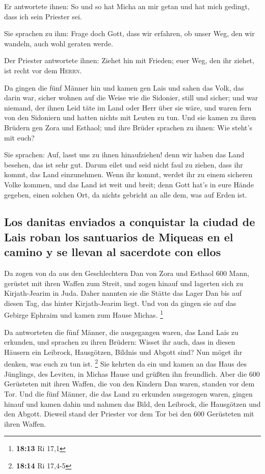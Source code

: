  Er antwortete ihnen: So und so hat Micha an mir getan und
hat mich gedingt, dass ich sein Priester sei.

 Sie sprachen zu ihm: Frage doch Gott, dass wir erfahren,
ob unser Weg, den wir wandeln, auch wohl geraten werde.

 Der Priester antwortete ihnen: Ziehet hin mit Frieden;
euer Weg, den ihr ziehet, ist recht vor dem \textsc{Herrn}.

 Da gingen die fünf Männer hin und kamen gen Lais und
sahen das Volk, das darin war, sicher wohnen auf die Weise wie die
Sidonier, still und sicher; und war niemand, der ihnen Leid täte im Land
oder Herr über sie wäre, und waren fern von den Sidoniern und hatten
nichts mit Leuten zu tun.  Und sie kamen zu ihren Brüdern
gen Zora und Esthaol; und ihre Brüder sprachen zu ihnen: Wie steht's mit
euch?

 Sie sprachen: Auf, lasst uns zu ihnen hinaufziehen! denn
wir haben das Land besehen, das ist sehr gut. Darum eilet und seid nicht
faul zu ziehen, dass ihr kommt, das Land einzunehmen. 
Wenn ihr kommt, werdet ihr zu einem sicheren Volke kommen, und das Land
ist weit und breit; denn Gott hat's in eure Hände gegeben, einen solchen
Ort, da nichts gebricht an alle dem, was auf Erden ist.

\hypertarget{los-danitas-enviados-a-conquistar-la-ciudad-de-lais-roban-los-santuarios-de-miqueas-en-el-camino-y-se-llevan-al-sacerdote-con-ellos}{%
\subsection{Los danitas enviados a conquistar la ciudad de Lais roban
los santuarios de Miqueas en el camino y se llevan al sacerdote con
ellos}\label{los-danitas-enviados-a-conquistar-la-ciudad-de-lais-roban-los-santuarios-de-miqueas-en-el-camino-y-se-llevan-al-sacerdote-con-ellos}}

 Da zogen von da aus den Geschlechtern Dan von Zora und
Esthaol 600 Mann, gerüstet mit ihren Waffen zum Streit, 
und zogen hinauf und lagerten sich zu Kirjath-Jearim in Juda. Daher
nannten sie die Stätte das Lager Dan bis auf diesen Tag, das hinter
Kirjath-Jearim liegt.  Und von da gingen sie auf das
Gebirge Ephraim und kamen zum Hause Michas. \footnote{\textbf{18:13} Ri
  17,1}

 Da antworteten die fünf Männer, die ausgegangen waren,
das Land Lais zu erkunden, und sprachen zu ihren Brüdern: Wisset ihr
auch, dass in diesen Häusern ein Leibrock, Hausgötzen, Bildnis und
Abgott sind? Nun möget ihr denken, was euch zu tun ist. \footnote{\textbf{18:14}
  Ri 17,4-5}  Sie kehrten da ein und kamen an das Haus
des Jünglings, des Leviten, in Michas Hause und grüßten ihn freundlich.
 Aber die 600 Gerüsteten mit ihren Waffen, die von den
Kindern Dan waren, standen vor dem Tor.  Und die fünf
Männer, die das Land zu erkunden ausgezogen waren, gingen hinauf und
kamen dahin und nahmen das Bild, den Leibrock, die Hausgötzen und den
Abgott. Dieweil stand der Priester vor dem Tor bei den 600 Gerüsteten
mit ihren Waffen.

